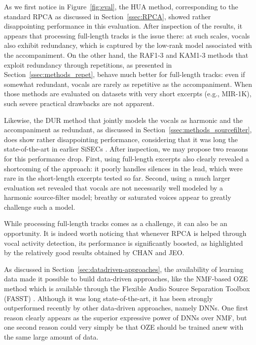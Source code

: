 As we first notice in Figure~\ref{fig:eval}, the HUA method, corresponding to the standard RPCA as discussed in Section~\ref{ssec:RPCA}, showed rather disappointing performance in this evaluation. After inspection of the results, it appears that processing full-length tracks is the issue there: at such scales, vocals also exhibit redundancy, which is captured by the low-rank model associated with the accompaniment. On the other hand, the RAF1-3 and KAM1-3 methods that exploit redundancy through repetitions, as presented in Section~\ref{ssec:methods_repet}, behave much better for full-length tracks: even if somewhat redundant, vocals are rarely as repetitive as the accompaniment. When those methods are evaluated on datasets with very short excerpts (e.g., MIR-1K), such severe practical drawbacks are not apparent.

Likewise, the DUR method that jointly models the vocals as harmonic and the accompaniment as redundant, as discussed in Section~\ref{ssec:methods_sourcefilter}, does show rather disappointing performance, considering that it was long the state-of-the-art in earlier SiSECs \cite{vincent12}. After inspection, we may propose two reasons for this performance drop. First, using full-length excerpts also clearly revealed a shortcoming of the approach: it poorly handles silences in the lead, which were rare in the short-length excerpts tested so far. Second, using a much larger evaluation set revealed that vocals are not necessarily well modeled by a harmonic source-filter model; breathy or saturated voices appear to greatly challenge such a model.

While processing full-length tracks comes as a challenge, it can also be an opportunity. It is indeed worth noticing that whenever RPCA is helped through vocal activity detection, its performance is significantly boosted, as highlighted by the relatively good results obtained by CHAN and JEO.

As discussed in Section~\ref{sec:datadriven-approaches}, the availability of learning data made it possible to build data-driven approaches, like the NMF-based OZE method which is available through the Flexible Audio Source Separation Toolbox (FASST) \cite{salaun14,ozerov12}. Although it was long state-of-the-art, it has been strongly outperformed recently by other data-driven approaches, namely DNNs. One first reason clearly appears as the superior expressive power of DNNs over NMF, but one second reason could very simply be that OZE should be trained anew with the same large amount of data.


